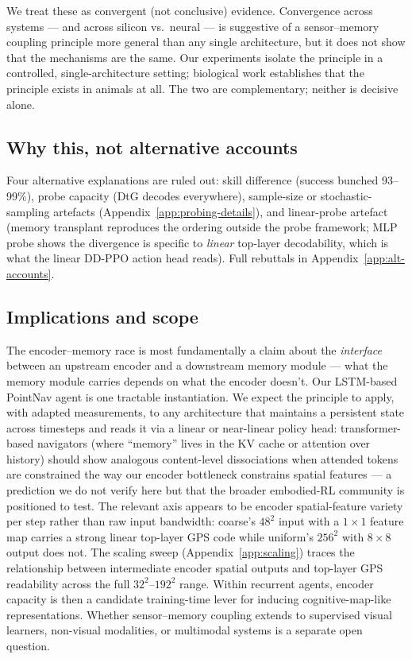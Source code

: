 \documentclass{article}
\newcommand{\uncertain}[1]{{\color{uncertaincol}#1}}
\begin{document}
We treat these as convergent (not conclusive) evidence. Convergence across systems --- and across silicon vs.\ neural --- is suggestive of a sensor--memory coupling principle more general than any single architecture, but it does not show that the mechanisms are the same. Our experiments isolate the principle in a controlled, single-architecture setting; biological work establishes that the principle exists in animals at all. The two are complementary; neither is decisive alone.

\subsection{Why this, not alternative accounts}

Four alternative explanations are ruled out: skill difference (success bunched 93--99\%), probe capacity (DtG decodes everywhere), sample-size or stochastic-sampling artefacts (Appendix~\ref{app:probing-details}), and linear-probe artefact (memory transplant reproduces the ordering outside the probe framework; MLP probe shows the divergence is specific to \emph{linear} top-layer decodability, which is what the linear DD-PPO action head reads). Full rebuttals in Appendix~\ref{app:alt-accounts}.

\subsection{Implications and scope}

The encoder--memory race is most fundamentally a claim about the \emph{interface} between an upstream encoder and a downstream memory module --- what the memory module carries depends on what the encoder doesn't. Our LSTM-based PointNav agent is one tractable instantiation. We expect the principle to apply, with adapted measurements, to any architecture that maintains a persistent state across timesteps and reads it via a linear or near-linear policy head: transformer-based navigators (where ``memory'' lives in the KV cache or attention over history) should show analogous content-level dissociations when attended tokens are constrained the way our encoder bottleneck constrains spatial features --- a prediction we do not verify here but that the broader embodied-RL community is positioned to test. \uncertain{The relevant axis appears to be encoder spatial-feature variety per step rather than raw input bandwidth: coarse's $48^2$ input with a $1{\times}1$ feature map carries a strong linear top-layer GPS code while uniform's $256^2$ with $8{\times}8$ output does not.} The scaling sweep (Appendix~\ref{app:scaling}) traces the relationship between intermediate encoder spatial outputs and top-layer GPS readability across the full $32^2$--$192^2$ range. Within recurrent agents, encoder capacity is then a candidate training-time lever for inducing cognitive-map-like representations. Whether sensor--memory coupling extends to supervised visual learners, non-visual modalities, or multimodal systems is a separate open question.
\end{document}
